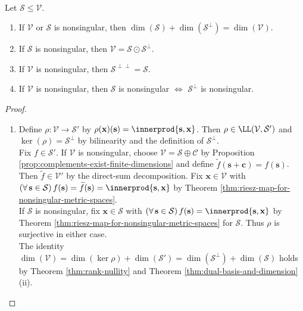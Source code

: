\begin{theorem} \label{thm:metric-orthogonal-complement-dimension} \\
Let $\mathcal{S}\leq\mathcal{V}$.
\begin{enumerate}[label=(\roman*)]
\setlength{\itemsep}{0pt}
\item If $\mathcal{V}$ or $\mathcal{S}$ is nonsingular, then $\dim(\mathcal{S})+\dim(\mathcal{S}^{\perp})=\dim(\mathcal{V})$.
\item If $\mathcal{S}$ is nonsingular, then $\mathcal{V}=\mathcal{S}\odot\mathcal{S}^{\perp}$.
\item If $\mathcal{V}$ is nonsingular, then $\mathcal{S}^{\perp\perp}=\mathcal{S}$.
\item If $\mathcal{V}$ is nonsingular, then $\mathcal{S}$ is nonsingular $\Longleftrightarrow$ $\mathcal{S}^{\perp}$ is nonsingular.
\end{enumerate}
\begin{proof}
\begin{enumerate}[label=(\roman*)]
\setlength{\itemsep}{0pt}
\item[$(i)$] Define $\rho:\mathcal{V}\to\mathcal{S}'$ by $\rho(\mathbf{x})(\mathbf{s})=\innerprod{\mathbf{s},\mathbf{x}}$. Then $\rho\in\LL(\mathcal{V},\mathcal{S}')$ and $\ker(\rho)=\mathcal{S}^{\perp}$ by bilinearity and the definition of $\mathcal{S}^{\perp}$.\\
Fix $f\in\mathcal{S}'$. If $\mathcal{V}$ is nonsingular, choose $\mathcal{V}=\mathcal{S}\oplus\mathcal{C}$ by Proposition \ref{prop:complements-exist-finite-dimensions} and define $\widetilde f(\mathbf{s}+\mathbf{c})=f(\mathbf{s})$.\\
Then $\widetilde f\in\mathcal{V}'$ by the direct-sum decomposition. Fix $\mathbf{x}\in\mathcal{V}$ with $(\forall\,\mathbf{s}\in\mathcal{S})\,f(\mathbf{s})=\widetilde f(\mathbf{s})=\innerprod{\mathbf{s},\mathbf{x}}$ by Theorem \ref{thm:riesz-map-for-nonsingular-metric-spaces}.\\
If $\mathcal{S}$ is nonsingular, fix $\mathbf{x}\in\mathcal{S}$ with $(\forall\,\mathbf{s}\in\mathcal{S})\,f(\mathbf{s})=\innerprod{\mathbf{s},\mathbf{x}}$ by Theorem \ref{thm:riesz-map-for-nonsingular-metric-spaces} for $\mathcal{S}$. Thus $\rho$ is surjective in either case.\\
The identity $\dim(\mathcal{V})=\dim(\ker\rho)+\dim(\mathcal{S}')=\dim(\mathcal{S}^{\perp})+\dim(\mathcal{S})$ holds by Theorem \ref{thm:rank-nullity} and Theorem \ref{thm:dual-basis-and-dimension}(ii).

\end{enumerate}
\end{proof}
\end{theorem}
